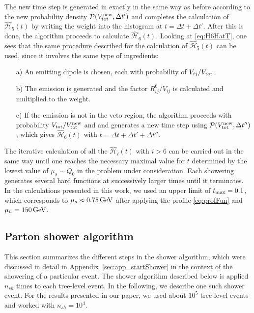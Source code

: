 \documentclass[11pt,a4paper]{article}
\begin{document}
The new time step is generated in exactly in the same way as before according to  the new probability density $\mathcal{ P} (V_{{\rm tot}}^{{\rm new}},\Delta t')$ and completes the calculation of $\mathcal{\hat{H}}_5(t)$ by  writing the weight into the histogram at $t=\Delta t +\Delta t'$. After this is done, the algorithm proceeds  to calculate $\mathcal{\hat{H}}_6(t)$. Looking at \eqref{eq:H6HatT}, one sees that the same procedure described for the calculation of $\mathcal{\hat{H}}_5(t)$ can be used, since it involves the same type of ingredients:
\begin{itemize}
 \item[a)] An emitting dipole is chosen, each with probability of ${V_{ij}}/{V_{{\rm tot}}}$.
 \item[b)]  The emission is generated and the factor ${R_{ij}^6}/{V_{ij}}$ is calculated and multiplied to the weight. 
 \item[c)] If the emission is not in the veto region, the algorithm proceeds with probability ${V_{{\rm tot}}}/{V_{{\rm tot}}^{{\rm new}}}$ and and generates a new time step using $\mathcal{ P} ( V_{{\rm tot}}^{{\rm new}},\Delta t'')$, which gives $\mathcal{\hat{H}}_6(t)$ with  $t = \Delta t+\Delta t'+\Delta t''$.
\end{itemize}
The iterative calculation of all the  $\mathcal{\hat{H}}_{i}(t)$ with $i > 6$ can be carried out in the same way until one reaches the necessary maximal value for $t$ determined by the lowest value of $\mu_s\sim Q_0$ in the problem under consideration. Each showering generates several hard functions at successively larger times until it terminates. In the calculations presented in this work, we used an upper limit of $t_{\rm max}=0.1$, which corresponds to $\mu_s\approx 0.75\,{\rm GeV}$ after applying the profile \eqref{eq:profFun} and $\mu_h=150\,{\rm GeV}$. 

\subsection{Parton shower algorithm}\label{sec:app_alg}

This section summarizes the different steps in the shower algorithm, which were discussed in detail in Appendix~\ref{sec:app_startShower} in the context of the showering of a particular event.
The shower algorithm described below is applied $n_{sh}$ times to each tree-level event. In the following, we describe one such shower event. For the results presented in our paper, we used about $10^5$ tree-level events and worked with $n_{sh}=10^4$.
\end{document}
